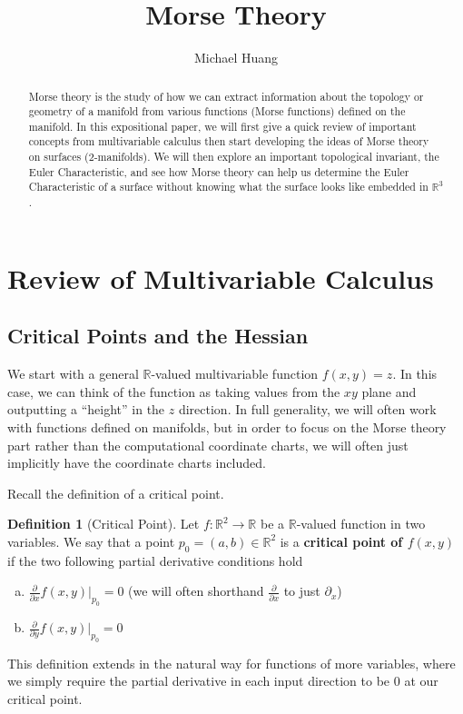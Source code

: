 \documentclass[12pt]{article}
\title{Morse Theory}
\author{Michael Huang}
\date{}
\newcommand{\bR}{{\mathbb R}}
\theoremstyle{definition}
\newtheorem{definition}{Definition}
\begin{document}
\graphicspath{ {images/} }
	
\maketitle

\begin{abstract}
	Morse theory is the study of how we can extract information about the topology or geometry of a manifold from various functions (Morse functions) defined on the manifold. In this expositional paper, we will first give a quick review of important concepts from multivariable calculus then start developing the ideas of Morse theory on surfaces (2-manifolds). We will then explore an important topological invariant, the Euler Characteristic, and see how Morse theory can help us determine the Euler Characteristic of a surface without knowing what the surface looks like embedded in $\bR^3$. 
\end{abstract}

\section{Review of Multivariable Calculus}

\subsection{Critical Points and the Hessian}
We start with a general $\bR$-valued multivariable function $f(x,y)=z$. In this case, we can think of the function as taking values from the $xy$ plane and outputting a ``height'' in the $z$ direction. In full generality, we will often work with functions defined on manifolds, but in order to focus on the Morse theory part rather than the computational coordinate charts, we will often just implicitly have the coordinate charts included. 

Recall the definition of a critical point. 

\begin{definition}[Critical Point]
	Let $f:\bR^2\rightarrow \bR$ be a $\bR$-valued function in two variables. We say that a point $p_0= (a,b)\in \bR^2$ is a \textbf{critical point of $f(x,y)$} if the two following partial derivative conditions hold
	\begin{enumerate}[(a)]
		\item $\frac{\partial}{\partial x}f(x,y)|_{p_0} = 0$ (we will often shorthand $\frac{\partial}{\partial x}$ to just $\partial_x$)
		\item $\frac{\partial}{\partial y}f(x,y)|_{p_0} = 0$
	\end{enumerate}
	This definition extends in the natural way for functions of more variables, where we simply require the partial derivative in each input direction to be 0 at our critical point. 
\end{definition}
\end{document}
